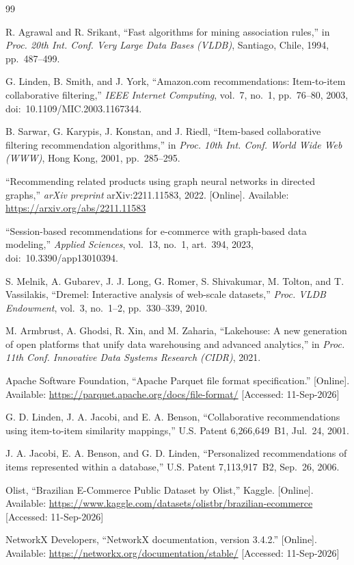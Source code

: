 \documentclass[11pt,a4paper]{article}
\begin{document}
\begin{thebibliography}{99}
\footnotesize

R. Agrawal and R. Srikant, ``Fast algorithms for mining association rules,'' in
\textit{Proc. 20th Int. Conf. Very Large Data Bases (VLDB)}, Santiago, Chile, 1994,
pp.~487--499.

G. Linden, B. Smith, and J. York, ``Amazon.com recommendations: Item-to-item collaborative
filtering,'' \textit{IEEE Internet Computing}, vol.~7, no.~1, pp.~76--80, 2003,
doi:~10.1109/MIC.2003.1167344.

B. Sarwar, G. Karypis, J. Konstan, and J. Riedl, ``Item-based collaborative filtering
recommendation algorithms,'' in \textit{Proc. 10th Int. Conf. World Wide Web (WWW)}, Hong Kong,
2001, pp.~285--295.

``Recommending related products using graph neural networks in directed graphs,''
\textit{arXiv preprint} arXiv:2211.11583, 2022. [Online]. Available:
\url{https://arxiv.org/abs/2211.11583}

``Session-based recommendations for e-commerce with graph-based data modeling,''
\textit{Applied Sciences}, vol.~13, no.~1, art.~394, 2023, doi:~10.3390/app13010394.

S. Melnik, A. Gubarev, J. J. Long, G. Romer, S. Shivakumar, M. Tolton, and T. Vassilakis,
``Dremel: Interactive analysis of web-scale datasets,'' \textit{Proc. VLDB Endowment},
vol.~3, no.~1--2, pp.~330--339, 2010.

M. Armbrust, A. Ghodsi, R. Xin, and M. Zaharia, ``Lakehouse: A new generation of open platforms
that unify data warehousing and advanced analytics,'' in \textit{Proc. 11th Conf. Innovative
Data Systems Research (CIDR)}, 2021.

Apache Software Foundation, ``Apache Parquet file format specification.'' [Online]. Available:
\url{https://parquet.apache.org/docs/file-format/} [Accessed: 11-Sep-2026]

G. D. Linden, J. A. Jacobi, and E. A. Benson, ``Collaborative recommendations using
item-to-item similarity mappings,'' U.S. Patent 6{,}266{,}649~B1, Jul.~24, 2001.

J. A. Jacobi, E. A. Benson, and G. D. Linden, ``Personalized recommendations of items
represented within a database,'' U.S. Patent 7{,}113{,}917~B2, Sep.~26, 2006.

Olist, ``Brazilian E-Commerce Public Dataset by Olist,'' Kaggle. [Online]. Available:
\url{https://www.kaggle.com/datasets/olistbr/brazilian-ecommerce} [Accessed: 11-Sep-2026]

NetworkX Developers, ``NetworkX documentation, version 3.4.2.'' [Online]. Available:
\url{https://networkx.org/documentation/stable/} [Accessed: 11-Sep-2026]

\end{thebibliography}
\end{document}
